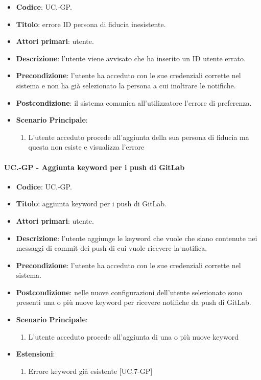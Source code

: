 		\begin{itemize}
			\item \textbf{Codice}: UC\theuccount.\thesubuccount-GP.
			\item \textbf{Titolo}: errore ID persona di fiducia inesistente.
			\item \textbf{Attori primari}: utente.
			\item \textbf{Descrizione}: l’utente viene avvisato che ha inserito un ID utente errato.
			\item \textbf{Precondizione}: l’utente ha acceduto con le sue credenziali corrette nel sistema e non ha già selezionato la persona a cui inoltrare le notifiche.
			\item \textbf{Postcondizione}: il sistema comunica all’utilizzatore l’errore di preferenza.
			\item \textbf{Scenario Principale}:
			\begin{enumerate}
				\item L'utente acceduto procede all'aggiunta della sua persona di fiducia ma questa non esiste e visualizza l'errore
			\end{enumerate}
		\end{itemize}
	
	\paragraph{UC\theuccount.\thesubuccount-GP - Aggiunta keyword per i push di GitLab}
		
		\begin{itemize}
			\item \textbf{Codice}: UC\theuccount.\thesubuccount-GP.
			\item \textbf{Titolo}: aggiunta keyword per i push di GitLab.
			\item \textbf{Attori primari}: utente.
			\item \textbf{Descrizione}: l’utente aggiunge le keyword che vuole che siano contenute nei messaggi di commit dei push di cui vuole ricevere la notifica.
			\item \textbf{Precondizione}: l’utente ha acceduto con le sue credenziali corrette nel sistema.
			\item \textbf{Postcondizione}: nelle nuove configurazioni dell'utente selezionato sono presenti una o più nuove keyword per ricevere notifiche da push di GitLab.
			\item \textbf{Scenario Principale}:
			\begin{enumerate}
				\item L'utente acceduto procede all'aggiunta di una o più nuove keyword
			\end{enumerate}
			\item \textbf{Estensioni}:
			\begin{enumerate}
				\item Errore keyword già esistente [UC\theuccount.7-GP]
			\end{enumerate}
		\end{itemize}
	
